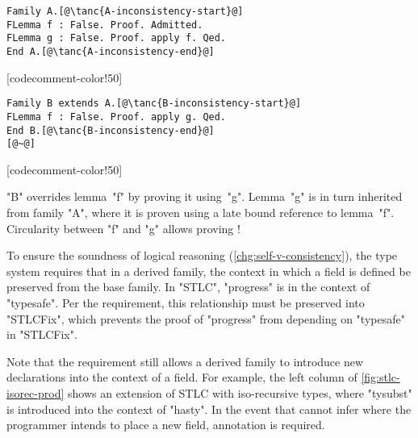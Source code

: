 \begin{centered}
\begin{minipage}{36ex}
\begin{lstlisting}[basicstyle=\fontsize{8.25}{9}\ttfamily]
Family A.[@\tanc{A-inconsistency-start}@]
FLemma f : False. Proof. Admitted.
FLemma g : False. Proof. apply f. Qed.
End A.[@\tanc{A-inconsistency-end}@]
\end{lstlisting}
\end{minipage}
[codecomment-color!50]
\hspace{3.5em}
\begin{minipage}{36ex}
\begin{lstlisting}[basicstyle=\fontsize{8.25}{9}\ttfamily]
Family B extends A.[@\tanc{B-inconsistency-start}@]
FLemma f : False. Proof. apply g. Qed.
End B.[@\tanc{B-inconsistency-end}@]
[@~@]
\end{lstlisting}
\end{minipage}
[codecomment-color!50]
\end{centered}

\noindent
"B" overrides lemma~"f" by proving it using~"g".
Lemma~"g" is in turn inherited from family "A", where it is proven using
a late bound reference to lemma~"f".
Circularity between "f" and "g" allows proving !

To ensure the soundness of logical reasoning (\ref{chg:self-v-consistency}),
the type system requires that in a derived family, the context in which
a field is defined be preserved from the base family.
In "STLC", "progress" is in the context of "typesafe".
Per the requirement, this relationship must be preserved into
"STLCFix", which prevents the proof of "progress" from depending on
"typesafe" in "STLCFix".

Note that the requirement still allows a derived family to introduce
new declarations into the context of a field. %
For example, the left column of \cref{fig:stlc-isorec-prod} shows an
extension of STLC with iso-recursive types, where "tysubst" is
introduced into the context of "hasty".
%
In the event that \Lang cannot infer where the programmer intends to place a new field,
annotation is required. 




